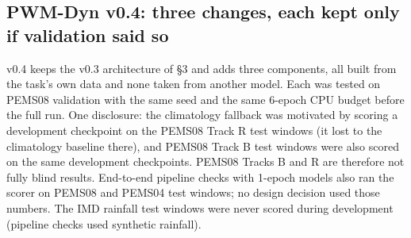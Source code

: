 \documentclass[
  10pt,
]{article}
\begin{document}
\subsection{PWM-Dyn v0.4: three changes, each kept only if validation
said so}

v0.4 keeps the v0.3 architecture of §3 and adds three components, all
built from the task's own data and none taken from another model. Each
was tested on PEMS08 validation with the same seed and the same 6-epoch
CPU budget before the full run. One disclosure: the climatology fallback
was motivated by scoring a development checkpoint on the PEMS08 Track R
test windows (it lost to the climatology baseline there), and PEMS08
Track B test windows were also scored on the same development
checkpoints. PEMS08 Tracks B and R are therefore not fully blind
results. End-to-end pipeline checks with 1-epoch models also ran the
scorer on PEMS08 and PEMS04 test windows; no design decision used those
numbers. The IMD rainfall test windows were never scored during
development (pipeline checks used synthetic rainfall).
\end{document}
